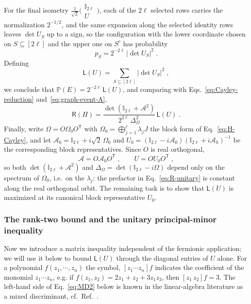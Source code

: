 \documentclass[prx,twocolumn,superscriptaddress,aps,10pt, frontmatterverbose, reprint,footinbib,longbibliography=true]{revtex4-2}
\newcommand{\trans}{\mathsf{T}}
\begin{document}
For the final isometry $\frac{1}{\sqrt2}\big(\begin{smallmatrix}\mathbb{I}_{2\ell}\\ U\end{smallmatrix}\big)$, each of the $2\ell$ selected rows carries the normalization $2^{-1/2}$, and the same expansion along the selected identity rows leaves $\det U_S$ up to a sign, so the configuration with the lower coordinate chosen on $S\subseteq[2\ell]$ and the upper one on $S^c$ has probability
\begin{equation}
    p_S=2^{-2\ell}\,|\det U_S|^2\;.
\end{equation}
Defining
\begin{equation}
    \mathsf{L}(U)=\sum_{S\subseteq[2\ell]}|\det U_S|^2\;,
    \label{eq:L-definition}
    \end{equation}
we conclude that $\mathbb{P}(E)=2^{-2\ell}\,\mathsf{L}(U)$, and comparing with Eqs.~\eqref{eq:Cayley-reduction} and~\eqref{eq:graph-event-A},
\begin{equation}
    \mathsf{R}(H)=\frac{\det(\mathbb{I}_{2\ell}+\mathcal{A}^2)}{2^{2\ell}\,\Delta_\Omega^2}\,\mathsf{L}(U)\;.
    \label{eq:R-unitary}
\end{equation}
Finally, write $\Omega=O\Omega_0O^{\trans}$ with $\Omega_0=\bigoplus_{j=1}^{\ell}\lambda_jJ$ the block form of Eq.~\eqref{eq:H-Cayley}, and let $\mathcal{A}_0=\mathbb{I}_{2\ell}+i\sqrt2\,\Omega_0$ and $U_0=(\mathbb{I}_{2\ell}-i\mathcal{A}_0)(\mathbb{I}_{2\ell}+i\mathcal{A}_0)^{-1}$ be the corresponding block representatives. Since $O$ is real orthogonal,
\begin{equation}
    \mathcal{A}=O\mathcal{A}_0O^{\trans}\;,\qquad U=OU_0O^{\trans}\;,
\end{equation}
so both $\det(\mathbb{I}_{2\ell}+\mathcal{A}^2)$ and $\Delta_\Omega=\det(\mathbb{I}_{2\ell}-i\Omega)$ depend only on the spectrum of $\Omega_0$, i.e.\ on the $\lambda_j$: the prefactor in Eq.~\eqref{eq:R-unitary} is constant along the real orthogonal orbit. The remaining task is to show that $\mathsf{L}(U)$ is maximized at its canonical block representative $U_0$.

\subsubsection{ The rank-two bound and the unitary principal-minor inequality}
\label{app:proof:MD2}

Now we introduce a matrix inequality independent of the fermionic application; we will use it below to bound $\mathsf{L}(U)$ through the diagonal entries of $U$ alone. 
For a polynomial $f(z_1, \cdots,z_n)$ the symbol, $[z_1\cdots z_n]f$ indicates the coefficient of the monomial $z_1\cdots z_n$, e.g. if $f(z_1,z_2)=2z_1+z_2+3 z_1z_3$, then $[z_1 \, z_2]f=3$.
The left-hand side of Eq.~\eqref{eq:MD2} below is known in the linear-algebra literature as a mixed discriminant, cf.\ Ref.~\cite{Bapat1989}.
\end{document}
